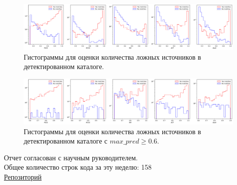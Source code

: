 \documentclass{article}
\begin{document}
\begin{figure}[h]
\includegraphics[width=\linewidth]{2circles_histogram}
\caption{Гистограммы для оценки количества ложных источников в детектированном каталоге.}
\label{Fig:Hist}
\end{figure}

\begin{figure}[h]
\includegraphics[width=\linewidth]{2circles_histogram_06}
\caption{Гистограммы для оценки количества ложных источников в детектированном каталоге с 
    $max\_pred \geqslant 0.6$.}
\label{Fig:Hist6}
\end{figure}

Отчет согласован с научным руководителем.\\
Общее количество строк кода за эту неделю: 158\\
\href{https://github.com/rt2122/data-segmentation-2}{Репозиторий}\\ 
\end{document}
